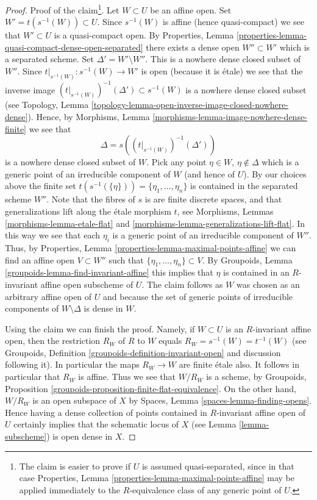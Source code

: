 \begin{proof}
\medskip\noindent
Proof of the claim\footnote{The claim is easier to prove if
$U$ is assumed quasi-separated, since in that case
Properties, Lemma \ref{properties-lemma-maximal-points-affine}
may be applied immediately to the $R$-equivalence class of any
generic point of $U$.}. Let $W \subset U$ be an affine open.
Set $W' = t(s^{-1}(W)) \subset U$. Since $s^{-1}(W)$ is affine
(hence quasi-compact) we see that $W' \subset U$ is a quasi-compact open. By
Properties, Lemma \ref{properties-lemma-quasi-compact-dense-open-separated}
there exists a dense open $W'' \subset W'$ which is a separated scheme.
Set $\Delta' = W' \setminus W''$. This is a nowhere dense closed subset of
$W''$. Since $t|_{s^{-1}(W)} : s^{-1}(W) \to W'$ is open (because it is \'etale)
we see that the inverse image
$(t|_{s^{-1}(W)})^{-1}(\Delta') \subset s^{-1}(W)$
is a nowhere dense closed subset (see
Topology, Lemma \ref{topology-lemma-open-inverse-image-closed-nowhere-dense}).
Hence, by
Morphisms, Lemma \ref{morphisms-lemma-image-nowhere-dense-finite} 
we see that
$$
\Delta = s\left((t|_{s^{-1}(W)})^{-1}(\Delta')\right)
$$
is a nowhere dense closed subset of $W$. Pick any point $\eta \in W$,
$\eta \not \in \Delta$ which is a generic point of an irreducible
component of $W$ (and hence of $U$). By our choices above the finite set
$t(s^{-1}(\{\eta\})) = \{\eta_1, \ldots, \eta_n\}$
is contained in the separated scheme $W''$.
Note that the fibres of $s$ is are finite discrete spaces, and that
generalizations lift along the \'etale morphism $t$, see
Morphisms, Lemmas \ref{morphisms-lemma-etale-flat}
and \ref{morphisms-lemma-generalizations-lift-flat}.
In this way we see that each $\eta_i$ is a generic point of an
irreducible component of $W''$. Thus, by
Properties, Lemma \ref{properties-lemma-maximal-points-affine}
we can find an affine open $V \subset W''$ such that
$\{\eta_1, \ldots, \eta_n\} \subset V$.
By
Groupoids, Lemma \ref{groupoids-lemma-find-invariant-affine}
this implies that $\eta$ is contained in an $R$-invariant affine
open subscheme of $U$. The claim follows as $W$ was chosen as an
arbitrary affine open of $U$ and because the set of generic points
of irreducible components of $W \setminus \Delta$ is dense in $W$.

\medskip\noindent
Using the claim we can finish the proof. Namely, if $W \subset U$ is
an $R$-invariant affine open, then the restriction $R_W$ of $R$ to $W$
equals $R_W = s^{-1}(W) = t^{-1}(W)$ (see
Groupoids, Definition \ref{groupoids-definition-invariant-open}
and discussion following it). In particular the maps $R_W \to W$ are
finite \'etale also. It follows in particular that $R_W$ is affine.
Thus we see that $W/R_W$ is a scheme, by
Groupoids, Proposition \ref{groupoids-proposition-finite-flat-equivalence}.
On the other hand, $W/R_W$ is an open subspace of $X$ by
Spaces, Lemma \ref{spaces-lemma-finding-opens}.
Hence having a dense collection of points contained in $R$-invariant
affine open of $U$ certainly implies that the schematic locus of $X$
(see Lemma \ref{lemma-subscheme})
is open dense in $X$.
\end{proof}

